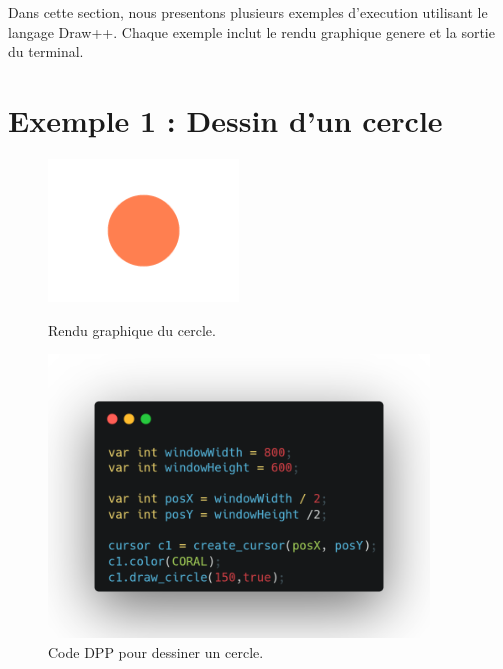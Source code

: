 \documentclass[12pt,a4paper]{report}
\begin{document}
Dans cette section, nous presentons plusieurs exemples d'execution utilisant le langage Draw++. Chaque exemple inclut le rendu graphique genere et la sortie du terminal.

\section{Exemple 1 : Dessin d'un cercle}
\begin{figure}[H]
    \centering
    \includegraphics[width=0.45\textwidth]{assets/render/draw_circle.png}
    \caption{Rendu graphique du cercle.}
    \includegraphics[width=0.9\textwidth]{assets/code/draw_circle_dpp.png}
    \caption{Code DPP pour dessiner un cercle.}
\end{figure}
\end{document}
